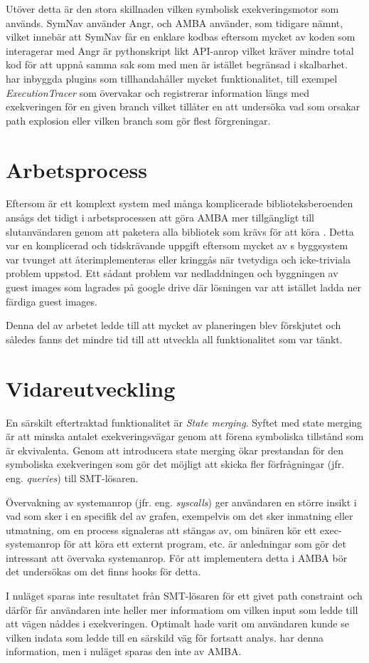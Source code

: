 Utöver detta är den stora skillnaden vilken symbolisk exekveringsmotor som
används. SymNav använder Angr, och AMBA använder, som tidigare nämnt, \stoe{}
vilket innebär att SymNav får en enklare kodbas eftersom mycket av koden som
interagerar med Angr är pythonskript likt API-anrop vilket kräver mindre total
kod för att uppnå samma sak som med \stoe{} men är istället begränsad i
skalbarhet. \stoe{} har inbyggda plugins som tillhandahåller mycket
funktionalitet, till exempel \emph{ExecutionTracer} som övervakar och
registrerar information längs med exekveringen för en given branch vilket
tillåter en att undersöka vad som orsakar path explosion eller vilken branch som
gör flest förgreningar.

\section{Arbetsprocess}
Eftersom \stoe{} är ett komplext system med många komplicerade
biblioteksberoenden ansågs det tidigt i arbetsprocessen att göra AMBA mer
tillgängligt till slutanvändaren genom att paketera alla bibliotek som krävs för
att köra \stoe{}. Detta var en komplicerad och tidskrävande uppgift eftersom
mycket av \stoe{}s byggsystem var tvunget att återimplementeras eller kringgås
när tvetydiga och icke-triviala problem uppstod. Ett sådant problem var
nedladdningen och byggningen av guest images som \stoe{} lagrades på google
drive där lösningen var att istället ladda ner färdiga guest images.

Denna del av arbetet ledde till att mycket av planeringen blev förskjutet och
således fanns det mindre tid till att utveckla all funktionalitet som var tänkt.

\section{Vidareutveckling}
En särskilt eftertraktad funktionalitet är \textit{State merging}. Syftet med
state merging är att minska antalet exekveringsvägar genom att förena symboliska
tillstånd som är ekvivalenta. Genom att introducera state merging ökar
prestandan för den symboliska exekveringen som gör det möjligt att skicka fler
förfrågningar (jfr. eng. \emph{queries}) till SMT-lösaren.

Övervakning av systemanrop (jfr. eng. \emph{syscalls}) ger användaren en större
insikt i vad som sker i en specifik del av grafen, exempelvis om det sker
inmatning eller utmatning, om en process signaleras att stängas av, om binären
kör ett exec-systemanrop för att köra ett externt program, etc. är anledningar
som gör det intressant att övervaka systemanrop. För att implementera detta i
AMBA bör det undersökas om det finns hooks för detta.

I nuläget sparas inte resultatet från SMT-lösaren för ett givet path constraint
och därför får användaren inte heller mer informatiom om vilken input som ledde
till att vägen nåddes i exekveringen. Optimalt hade varit om användaren kunde se
vilken indata som ledde till en särskild väg för fortsatt analys. \stoe{} har
denna information, men i nuläget sparas den inte av AMBA.

